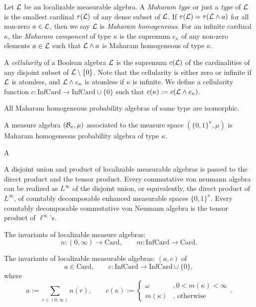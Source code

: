 \documentclass{../../large}
\begin{document}
\begin{prb}
Let $\mathcal{L}$ be an localizable measurable algebra.
A \emph{Maharam type} or just a \emph{type} of $\mathcal{L}$ is the smallest cardinal $\tau(\mathcal{L})$ of any dense subset of $\mathcal{L}$.
If $\tau(\mathcal{L})=\tau(\mathcal{L}\wedge a)$ for all non-zero $a\in\mathcal{L}$, then we say $\mathcal{L}$ is \emph{Maharam homogeneous}.
For an infinite cardinal $\kappa$, the \emph{Maharam component} of type $\kappa$ is the supremum $e_\kappa$ of any non-zero elements $a\in\mathcal{L}$ such that $\mathcal{L}\wedge a$ is Maharam homogeneous of type $\kappa$.

A \emph{cellularity} of a Boolean algebra $\mathcal{L}$ is the supremum $c(\mathcal{L})$ of the cardinalities of any disjoint subset of $\mathcal{L}\setminus\{0\}$.
Note that the cellularity is either zero or infinite if $\mathcal{L}$ is atomless, and $\mathcal{L}\wedge e_\kappa$ is atomless if $\kappa$ is infinite.
We define a cellularity function $c:\mathrm{InfCard}\to\mathrm{InfCard}\cup\{0\}$ such that $c(\kappa):=c(\mathcal{L}\wedge e_\kappa)$.

\begin{parts}
\item 
\item All Maharam homogeneous probability algebras of same type are isomorphic.
\item A measure algebra $(\mathcal{B}_\kappa,\mu)$ associated to the measure space $(\{0,1\}^\kappa,\mu)$ is Maharam homogeneous probability algebra of type $\kappa$.
\item A
\end{parts}
\end{prb}



A disjoint union and product of localizable measurable algebras is passed to the direct product and the tensor product.
Every commutative von neumann algebra can be realized as $L^\infty$ of the disjoint union, or equivalently, the direct product of $L^\infty$, of countably decomposable enhanced measurable spaces $\{0,1\}^\kappa$.
Every countably decomposable commutative von Neumann algebra is the tensor product of $\ell^\infty$'s.

The invariants of localizable measure algebras:
\[n:(0,\infty)\to\mathrm{Card},\qquad m:\mathrm{InfCard}\to\mathrm{Card}.\]

The invariants of localizable measurable algebras: $(a,c)$ of
\[a\in\mathrm{Card},\qquad c:\mathrm{InfCard}\to\mathrm{InfCard}\cup\{0\},\]
where
\[a:=\sum_{r\in(0,\infty)}n(r),\qquad c(\kappa):=\begin{cases}\omega&,0<m(\kappa)<\infty\\m(\kappa)&,\text{ otherwise}\end{cases}.\]
\end{document}

